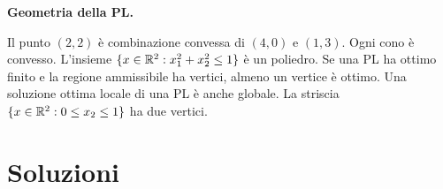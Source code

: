 \begin{description}[leftmargin=1.2cm,style=nextline,itemsep=1pt]
\item[\textbf{Q8}] \textbf{Geometria della PL.}
\begin{description}[leftmargin=1.2cm,itemsep=0pt]
 Il punto $(2,2)$ è combinazione convessa di $(4,0)$ e $(1,3)$.
 Ogni cono è convesso.
 L'insieme $\{x\in\mathbb{R}^2: x_1^2+x_2^2\le1\}$ è un poliedro.
 Se una PL ha ottimo finito e la regione ammissibile ha vertici, almeno un vertice è ottimo.
 Una soluzione ottima locale di una PL è anche globale.
 La striscia $\{x\in\mathbb{R}^2: 0\le x_2\le1\}$ ha due vertici.
\end{description}
\end{description}

\section*{Soluzioni}
